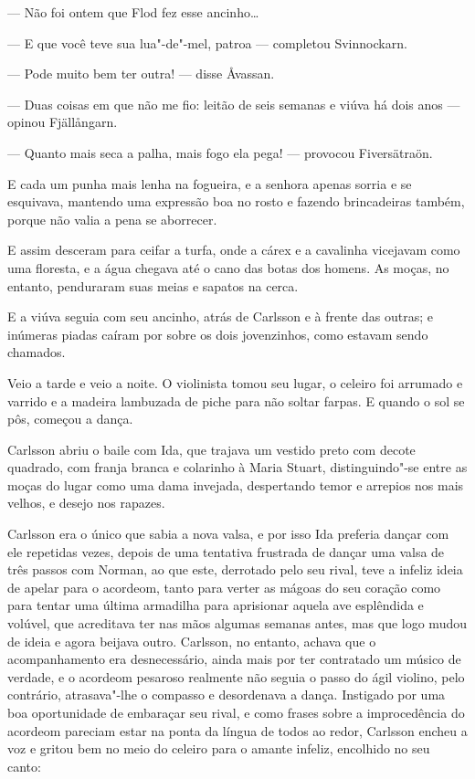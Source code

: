 --- Não foi ontem que Flod fez esse ancinho\ldots{}

--- E que você teve sua lua"-de"-mel, patroa --- completou Svinnockarn.

--- Pode muito bem ter outra! --- disse Åvassan.

--- Duas coisas em que não me fio: leitão de seis semanas e viúva há dois anos ---
opinou Fjällångarn.

--- Quanto mais seca a palha, mais fogo ela pega! --- provocou Fiversätraön.

E cada um punha mais lenha na fogueira, e a senhora apenas sorria e se
esquivava, mantendo uma expressão boa no rosto e fazendo brincadeiras também,
porque não valia a pena se aborrecer.

E assim desceram para ceifar a turfa, onde a cárex e a cavalinha vicejavam como
uma floresta, e a água chegava até o cano das botas dos homens. As moças, no
entanto, penduraram suas meias e sapatos na cerca.

E a viúva seguia com seu ancinho, atrás de Carlsson e à frente das outras; e
inúmeras piadas caíram por sobre os dois jovenzinhos, como estavam sendo
chamados.

Veio a tarde e veio a noite. O violinista tomou seu lugar, o celeiro foi
arrumado e varrido e a madeira lambuzada de piche para não soltar farpas. E
quando o sol se pôs, começou a dança.

Carlsson abriu o baile com Ida, que trajava um vestido preto com decote
quadrado, com franja branca e colarinho à Maria Stuart, distinguindo"-se entre as
moças do lugar como uma dama invejada, despertando temor e arrepios nos mais
velhos, e desejo nos rapazes.

Carlsson era o único que sabia a nova valsa, e por isso Ida preferia dançar com
ele repetidas vezes, depois de uma tentativa frustrada de dançar uma valsa de
três passos com Norman, ao que este, derrotado pelo seu rival, teve a infeliz
ideia de apelar para o acordeom, tanto para verter as mágoas do seu coração como
para tentar uma última armadilha para aprisionar aquela ave esplêndida e
volúvel, que acreditava ter nas mãos algumas semanas antes, mas que logo mudou
de ideia e agora beijava outro. Carlsson, no entanto, achava que o
acompanhamento era desnecessário, ainda mais por ter contratado um músico de
verdade, e o acordeom pesaroso realmente não seguia o passo do ágil violino, pelo
contrário, atrasava"-lhe o compasso e desordenava a dança. Instigado
por uma boa oportunidade de embaraçar seu rival, e como frases sobre a
improcedência do acordeom pareciam estar na ponta da língua de todos ao redor,
Carlsson encheu a voz e gritou bem no meio do celeiro para o amante infeliz,
encolhido no seu canto:

